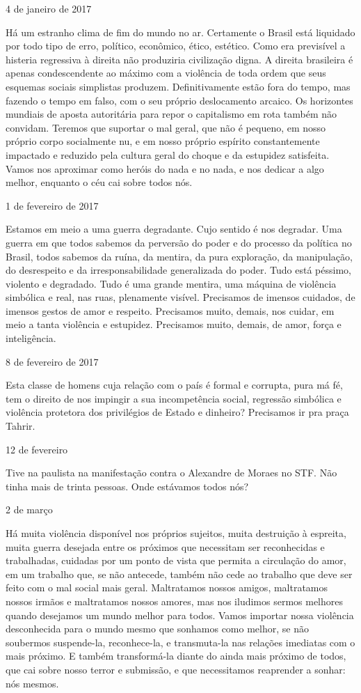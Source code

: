 4 de janeiro de 2017

Há um estranho clima de fim do mundo no ar. Certamente o Brasil está
liquidado por todo tipo de erro, político, econômico, ético, estético.
Como era previsível a histeria regressiva à direita não produziria
civilização digna. A direita brasileira é apenas condescendente ao
máximo com a violência de toda ordem que seus esquemas sociais
simplistas produzem. Definitivamente estão fora do tempo, mas fazendo o
tempo em falso, com o seu próprio deslocamento arcaico. Os horizontes
mundiais de aposta autoritária para repor o capitalismo em rota também
não convidam. Teremos que suportar o mal geral, que não é pequeno, em
nosso próprio corpo socialmente nu, e em nosso próprio espírito
constantemente impactado e reduzido pela cultura geral do choque e da
estupidez satisfeita. Vamos nos aproximar como heróis do nada e no nada,
e nos dedicar a algo melhor, enquanto o céu cai sobre todos nós.

1 de fevereiro de 2017

Estamos em meio a uma guerra degradante. Cujo sentido é nos degradar.
Uma guerra em que todos sabemos da perversão do poder e do processo da
política no Brasil, todos sabemos da ruína, da mentira, da pura
exploração, da manipulação, do desrespeito e da irresponsabilidade
generalizada do poder. Tudo está péssimo, violento e degradado. Tudo é
uma grande mentira, uma máquina de violência simbólica e real, nas ruas,
plenamente visível. Precisamos de imensos cuidados, de imensos gestos de
amor e respeito. Precisamos muito, demais, nos cuidar, em meio a tanta
violência e estupidez. Precisamos muito, demais, de amor, força e
inteligência.

8 de fevereiro de 2017

Esta classe de homens cuja relação com o país é formal e corrupta, pura
má fé, tem o direito de nos impingir a sua incompetência social,
regressão simbólica e violência protetora dos privilégios de Estado e
dinheiro? Precisamos ir pra praça Tahrir.

12 de fevereiro

Tive na paulista na manifestação contra o Alexandre de Moraes no STF.
Não tinha mais de trinta pessoas. Onde estávamos todos nós?

2 de março

Há muita violência disponível nos próprios sujeitos, muita destruição à
espreita, muita guerra desejada entre os próximos que necessitam ser
reconhecidas e trabalhadas, cuidadas por um ponto de vista que permita a
circulação do amor, em um trabalho que, se não antecede, também não cede
ao trabalho que deve ser feito com o mal social mais geral. Maltratamos
nossos amigos, maltratamos nossos irmãos e maltratamos nossos amores,
mas nos iludimos sermos melhores quando desejamos um mundo melhor para
todos. Vamos importar nossa violência desconhecida para o mundo mesmo
que sonhamos como melhor, se não soubermos suspende-la, reconhece-la, e
transmuta-la nas relações imediatas com o mais próximo. E também
transformá-la diante do ainda mais próximo de todos, que cai sobre nosso
terror e submissão, e que necessitamos reaprender a sonhar: nós mesmos.

